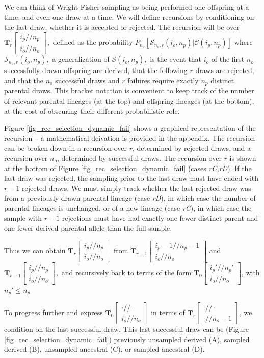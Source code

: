 \documentclass[review]{elsarticle}
\newcommand{\dslash}{/\!\!/}
\newcommand{\Coalc}[4]{\begin{bmatrix}#1\dslash #2 \\ #3\dslash #4 \end{bmatrix}}
\newcommand{\ms}{\mathcal{S}}
\begin{document}
We can think of Wright-Fisher sampling as being performed one offspring at a time,
and even one draw at a time. We will define recursions by conditioning on the last draw, 
whether it is accepted or rejected. 
The recursion will be over $\mathbf{T}_{r}\Coalc{i_p}{n_p}{i_o}{n_o},$ defined as the probability
$P_{n_o}\left[\ms_{n_o,r}(i_o, n_p) | \mathcal{C}(i_p, n_p)\right]$ where $\ms_{n_o,r}(i_o, n_p),$ 
a generalization of  $\ms(i_o, n_p),$ 
is the event that $i_o$ of the first $n_o$ successfully drawn offspring are derived, 
that the following $r$ draws are rejected, and that the $n_o$ successful draws
and $r$ failures require exactly $n_p$ distinct parental draws. 
This bracket notation is convenient to keep track of
the number of relevant parental lineages (at the top) and offspring lineages (at the bottom), at the
cost of obscuring their different probabilistic role.

Figure \ref{fig_rec_selection_dynamic_fail} shows a graphical representation of the recursion 
-- a mathematical deivation is provided in the appendix. 
The recursion can be broken down in a recursion over $r$, determined by rejected draws, 
and a recursion over $n_o$, determined by successful draws.  
The recursion over $r$ is shown at the bottom of
Figure \ref{fig_rec_selection_dynamic_fail} (cases \textit{rC,rD}). If the last draw was rejected, the sampling 
prior to the last draw must have ended with $r-1$ rejected draws. We
must simply track whether the last rejected draw was from a previously drawn parental lineage (case
\textit{rD}), in which case the number of parental lineages is unchanged, or of a new lineage (case
\textit{rC}), in which case the sample with $r-1$ rejections must have had exactly one fewer distinct parent and 
one fewer derived parental allele than the full sample.  
 
Thus we can obtain $\mathbf{T}_{r}\Coalc{i_p}{n_p}{i_o}{n_o}$ from
$\mathbf{T}_{r-1}\Coalc{i_p-1}{n_p-1}{i_o}{n_o}$ and $\mathbf{T}_{r-1}\Coalc{i_p}{n_p}{i_o}{n_o},$
and recursively back to terms of the form $\mathbf{T}_{0}\Coalc{i_p'}{n_p'}{i_o}{n_o}$, with $n_p'\leq n_p$
  
To progress further and express $\mathbf{T}_{0}\Coalc{\cdot}{\cdot}{i_o}{n_o}$ in terms of
$\mathbf{T}_{r}\Coalc{\cdot}{\cdot}{\cdot}{n_o-1}$, we condition on the last successful draw. This
last successful draw can be (Figure \ref{fig_rec_selection_dynamic_fail}) previously unsampled
derived (A), sampled derived (B), unsampled ancestral (C), or sampled ancestral (D).
  
\end{document}
